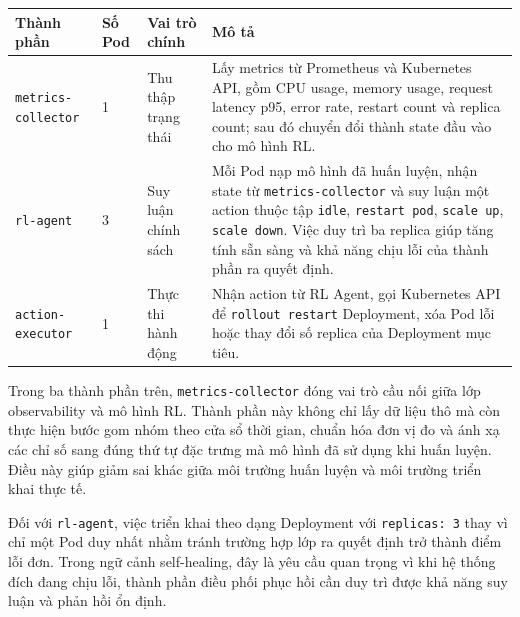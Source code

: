 \begin{center}
\label{tab:rl-agent-pods}
\footnotesize
\renewcommand{\arraystretch}{1.1}
\begin{tabular}{|L{3.2cm}|C{1.8cm}|L{3.1cm}|L{6.5cm}|}
\hline
\textbf{Thành phần} & \textbf{Số Pod} & \textbf{Vai trò chính} & \textbf{Mô tả} \\ \hline
\texttt{metrics-collector} & 1 & Thu thập trạng thái & Lấy metrics từ Prometheus và Kubernetes API, gồm CPU usage, memory usage, request latency p95, error rate, restart count và replica count; sau đó chuyển đổi thành state đầu vào cho mô hình RL. \\ \hline
\texttt{rl-agent} & 3 & Suy luận chính sách & Mỗi Pod nạp mô hình đã huấn luyện, nhận state từ \texttt{metrics-collector} và suy luận một action thuộc tập \texttt{idle}, \texttt{restart pod}, \texttt{scale up}, \texttt{scale down}. Việc duy trì ba replica giúp tăng tính sẵn sàng và khả năng chịu lỗi của thành phần ra quyết định. \\ \hline
\texttt{action-executor} & 1 & Thực thi hành động & Nhận action từ RL Agent, gọi Kubernetes API để \texttt{rollout restart} Deployment, xóa Pod lỗi hoặc thay đổi số replica của Deployment mục tiêu. \\ \hline
\end{tabular}
\end{center}

\noindent Trong ba thành phần trên, \texttt{metrics-collector} đóng vai trò cầu nối giữa lớp observability và mô hình RL. Thành phần này không chỉ lấy dữ liệu thô mà còn thực hiện bước gom nhóm theo cửa sổ thời gian, chuẩn hóa đơn vị đo và ánh xạ các chỉ số sang đúng thứ tự đặc trưng mà mô hình đã sử dụng khi huấn luyện. Điều này giúp giảm sai khác giữa môi trường huấn luyện và môi trường triển khai thực tế.

\noindent Đối với \texttt{rl-agent}, việc triển khai theo dạng Deployment với \texttt{replicas: 3} thay vì chỉ một Pod duy nhất nhằm tránh trường hợp lớp ra quyết định trở thành điểm lỗi đơn. Trong ngữ cảnh self-healing, đây là yêu cầu quan trọng vì khi hệ thống đích đang chịu lỗi, thành phần điều phối phục hồi cần duy trì được khả năng suy luận và phản hồi ổn định.

